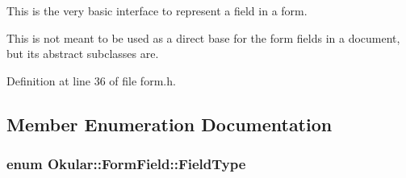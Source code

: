 This is the very basic interface to represent a field in a form.

This is not meant to be used as a direct base for the form fields in a document, but its abstract subclasses are. 

Definition at line 36 of file form.\+h.



\subsection{Member Enumeration Documentation}
\hypertarget{classOkular_1_1FormField_a46e9c2bd0942dfe55408c8c1aa5363cf}{
\subsubsection[{Field\+Type}]{\setlength{\rightskip}{0pt plus 5cm}enum {\bf Okular\+::\+Form\+Field\+::\+Field\+Type}}}\label{classOkular_1_1FormField_a46e9c2bd0942dfe55408c8c1aa5363cf}
